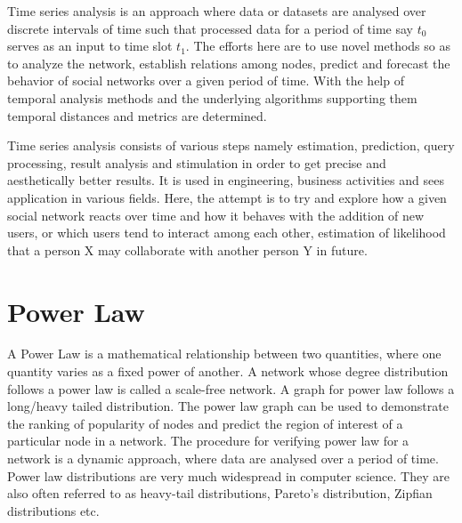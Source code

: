 Time series analysis is an approach where  data or datasets are analysed over discrete intervals of time such that processed data for a period of time say $t_0$ serves as an input to time slot $t_1$. The efforts here are to use novel methods so as to analyze the network, establish relations among nodes, predict and forecast the behavior of social networks over a given period of time. With the help of temporal analysis methods and the underlying algorithms supporting them temporal distances and metrics are determined. \citep{santoro2011time,o2010tweets}

Time series analysis consists of various steps namely estimation, prediction, query processing, result analysis and stimulation in order to get precise and aesthetically better results. It is used in engineering, business activities and sees application in various fields. Here, the attempt is to try and explore how a given social network reacts over time and how it behaves with the addition of new users, or which users tend to interact among each other, estimation of likelihood that a person X may collaborate with another person Y in future. 
\citep{o2010tweets,tang2009temporal}


\section{Power Law}
A Power Law is a mathematical relationship between two quantities, where one quantity varies as a fixed power of another.
A network whose degree distribution follows a power law is called a scale-free network. A graph for power law follows
a long/heavy tailed distribution. The power law graph can be used to demonstrate the ranking of popularity of nodes
and predict the region of interest of a particular node in a network. The procedure for verifying power law for a
network is a dynamic approach, where data are analysed over a period of time.
Power law distributions are very much widespread in computer science. They are also often referred to as heavy-tail distributions,
Pareto's distribution, Zipfian distributions etc.

